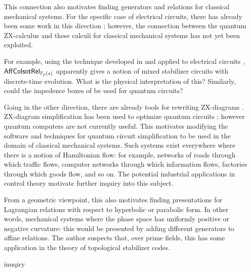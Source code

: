 This connection also motivates finding generators and relations for classical mechanical systems.
For the specific case of electrical circuits, there has already been some work in this direction \cite{impedence,kirch,amolak}; however, the connection between the quantum ZX-calculus and these calculi for classical mechanical systems has not yet been exploited.



For example, using the technique developed in \cite{control} and applied to electrical circuits \cite{network}, $\mathsf{Aff}{\sf Co}{\sf Isot}\mathsf{Rel}_{\mathbb{F}_p(s)}$ apparently gives a notion of mixed stabilizer circuits with discrete-time evolution.  What is the physical interpretation of this?  Similarly, could the impedence boxes of \cite{impedence} be used for quantum circuits?

Going in the other direction, there are already tools for rewriting ZX-diagrams  \cite{Kissinger2015,Pyzx,dizx,zxlive}.  ZX-diagram simplification has been used to optimize quantum circuits \cite{Duncan2020,Kissinger2020}; however quantum computers are not currently useful.  This motivates modifying the software and  techniques for quantum circuit simplification to be used in the domain of  classical mechanical systems. Such systems exist everywhere where there is a notion of Hamiltonian flow: for example, networks of roads through which traffic flows, computer networks through which information flows, factories through which goods flow, and so on. The potential industrial applications in control theory motivate further inquiry into this subject.


From a geometric viewpoint, this also motivates finding presentations for Lagrangian relations with respect to hyperbolic or parabolic form. In other words, mechanical systems where the phase space has uniformly positive or negative curvature: this would be presented by adding different generators to affine relations.  The author suspects that, over prime fields, this has some application in the theory of topological stabilizer codes.

inuqiry

%


